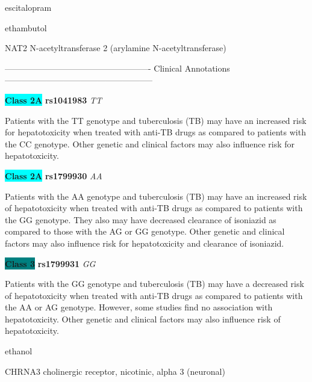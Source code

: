 \documentclass{resume} %
\begin{document}
\begin{rSection}{ escitalopram }
\end{rSection}\begin{rSection}{ ethambutol }
\item[]

\begin{rSubsection}{ NAT2 }{ N-acetyltransferase 2 (arylamine N-acetyltransferase) }{}{}
\item[]

\item[] ---------------------------------------------------- Clinical Annotations -----------------------------------------------------\newline
\item \textbf{\colorbox{cyan} {Class 2A}} \textbf{ rs1041983 } \textit{ TT }
\item[] Patients with the TT genotype and tuberculosis (TB) may have an increased risk for hepatotoxicity when treated with anti-TB drugs as compared to patients with the CC genotype. Other genetic and clinical factors may also influence risk for hepatotoxicity.\item \textbf{\colorbox{cyan} {Class 2A}} \textbf{ rs1799930 } \textit{ AA }
\item[] Patients with the AA genotype and tuberculosis (TB) may have an increased risk of hepatotoxicity when treated with anti-TB drugs as compared to patients with the GG genotype. They also may have decreased clearance of isoniazid as compared to those with the AG or GG genotype. Other genetic and clinical factors may also influence risk for hepatotoxicity and clearance of isoniazid.\item \textbf{\colorbox{teal} {Class 3}} \textbf{ rs1799931 } \textit{ GG }
\item[] Patients with the GG genotype and tuberculosis (TB) may have a decreased risk of hepatotoxicity when treated with anti-TB drugs as compared to patients with the AA or AG genotype. However, some studies find no association with hepatotoxicity. Other genetic and clinical factors may also influence risk of hepatotoxicity.
\end{rSubsection}

\end{rSection}\begin{rSection}{ ethanol }
\item[]

\begin{rSubsection}{ CHRNA3 }{ cholinergic receptor, nicotinic, alpha 3 (neuronal) }{}{}
\item[]


\end{rSubsection}
\end{rSection}
\end{document}
